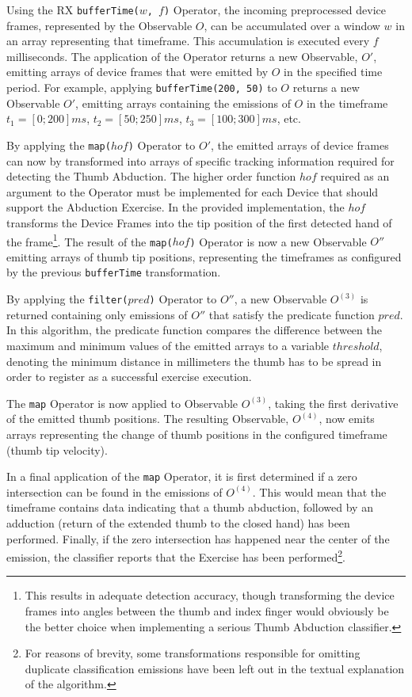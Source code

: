 Using the \gls{RX} \texttt{bufferTime($w$, $f$)} Operator, the incoming preprocessed device frames, represented by the Observable $O$, can be accumulated over a window $w$ in an array representing that timeframe. This accumulation is executed every $f$ milliseconds. The application of the Operator returns a new Observable, $O'$, emitting arrays of device frames that were emitted by $O$ in the specified time period. For example, applying \texttt{bufferTime(200, 50)} to $O$ returns a new Observable $O'$, emitting arrays containing the emissions of $O$ in the timeframe $t_1 = [0; 200] ms$, $t_2 = [50; 250] ms$, $t_3 = [100; 300] ms$, etc.

By applying the \texttt{map($hof$)} Operator to $O'$, the emitted arrays of device frames can now by transformed into arrays of specific tracking information required for detecting the Thumb Abduction. The higher order function $hof$ required as an argument to the Operator must be implemented for each Device that should support the Abduction Exercise. In the provided implementation, the $hof$ transforms the Device Frames into the tip position of the first detected hand of the frame\footnote{This results in adequate detection accuracy, though transforming the device frames into angles between the thumb and index finger would obviously be the better choice when implementing a serious Thumb Abduction classifier.}. The result of the \texttt{map($hof$)} Operator is now a new Observable $O''$ emitting arrays of thumb tip positions, representing the timeframes as configured by the previous \texttt{bufferTime} transformation.

By applying the \texttt{filter($pred$)} Operator to $O''$, a new Observable $O^{(3)}$ is returned containing only emissions of $O''$ that satisfy the predicate function $pred$. In this algorithm, the predicate function compares the difference between the maximum and minimum values of the emitted arrays to a variable $threshold$, denoting the minimum distance in millimeters the thumb has to be spread in order to register as a successful exercise execution.

The \texttt{map} Operator is now applied to Observable $O^{(3)}$, taking the first derivative of the emitted thumb positions. The resulting Observable, $O^{(4)}$, now emits arrays representing the change of thumb positions in the configured timeframe (thumb tip velocity).

In a final application of the \texttt{map} Operator, it is first determined if a zero intersection can be found in the emissions of $O^{(4)}$. This would mean that the timeframe contains data indicating that a thumb abduction, followed by an adduction (return of the extended thumb to the closed hand) has been performed. Finally, if the zero intersection has happened near the center of the emission, the classifier reports that the Exercise has been performed\footnote{For reasons of brevity, some transformations responsible for omitting duplicate classification emissions have been left out in the textual explanation of the algorithm.}.


